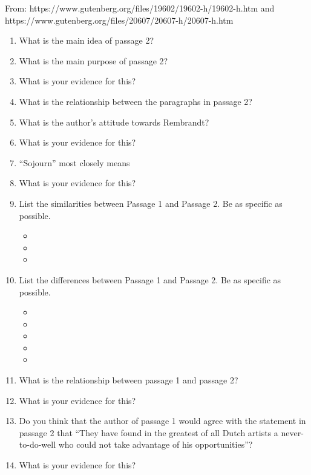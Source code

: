 \bigskip
\sloppy From: https://www.gutenberg.org/files/19602/19602-h/19602-h.htm and https://www.gutenberg.org/files/20607/20607-h/20607-h.htm

\begin{enumerate}

\item What is the main idea of passage 2? \hrulefill

\item What is the main purpose of passage 2? \hrulefill

\item What is your evidence for this? \hrulefill

\item What is the relationship between the paragraphs in passage 2? \hrulefill

\item What is the author's attitude towards Rembrandt? \hrulefill

\item What is your evidence for this? \hrulefill

\item ``Sojourn'' most closely means \hrulefill

\item What is your evidence for this? \hrulefill

\item List the similarities between Passage 1 and Passage 2. Be as specific as possible.
\begin{itemize}
\item
\item
\item
\end{itemize} 
 
\item List the differences between Passage 1 and Passage 2. Be as specific as possible.

\begin{itemize}
\item
\item
\item
\item
\item
\end{itemize} 

\item What is the relationship between passage 1 and passage 2? \hrulefill

\item What is your evidence for this? \hrulefill

\item Do you think that the author of passage 1 would agree with the statement in passage 2 that ``They have found in the greatest of all Dutch artists a never-to-do-well who could not take advantage of his opportunities''?

\hrulefill

\item What is your evidence for this? \hrulefill

\end{enumerate}

